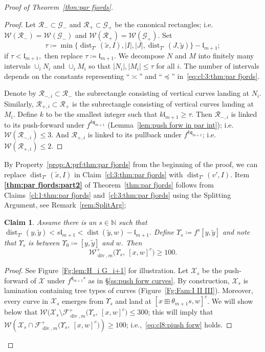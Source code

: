 \documentclass{amsart}
\newcommand{\1}{{\mathbb 1 }}
\newcommand{\FamG}{{\mathcal G}}
\renewcommand{\div}{{\operatorname{div}}}
\newcommand{\Fam}{{\mathcal F}}
\newcommand{\Width}{{\mathcal W}}
\newcommand\RR{\mathcal{R}}
\newcommand\XX{\mathcal{X}}
\newcommand{\qq}{\mathfrak{q}}
\newcommand{\length}{{\mathfrak l}}
\newtheorem{claim8}{Claim}
\newcommand{\N}{\mathbb{N}}
\theoremstyle{remark}
\numberwithin{equation}{section}
\theoremstyle{definition}
\newcommand{\dist}{\operatorname{dist}}
\begin{document}
\begin{proof}[Proof of Theorem~\ref{thm:par fjords}]
\begin{proof}
Let $\RR_-\subset \FamG_-$ and $\RR_+\subset \FamG_+$ be the canonical rectangles; i.e. $\Width(\RR_-)=\Width(\FamG_-)$ and $\Width(\RR_+)=\Width(\FamG_+)$. Set 
\[ \tau\coloneqq \min\{\dist_{T'}(\tilde x, I), |I|,  |J|, \dist_{T'}( J, \tilde y)\}-\length_{m+1};\]
if $\tau< \length_{m+1},$ then replace $\tau\coloneqq \length_{m+1}$. We decompose $N$ and $M$ into finitely many intervals $\cup_i N_i$ and $\cup_i M_i$ so that $|N_i|, |M_i| \le \tau$ for all $i$. The number of intervals depends on the constants representing ``$\asymp$'' and ``$\preceq$'' in~\eqref{eq:cl:3:thm:par fjords}. 

Denote by $\RR_{-,i}\subset \RR_-$ the subrectangle consisting of vertical curves landing at $N_i$. Similarly, $\RR_{+,i}\subset \RR_+$ is the subrectangle consisting of vertical curves landing at $M_i$. Define $k$ to be the smallest integer such that $k\length_{m+1}\ge \tau$.
Then $\RR_{-,i}$ is linked to its push-forward under $f^{k\qq_{m+1}}$ (Lemma~\ref{lem:push forw in par int}); i.e.~$\Width(\RR_{-,i})\le 3$. And $\RR_{+,i}$ is linked to its pullback under $f^{k\qq_{m+1}}$; i.e.~$\Width(\RR_{+,i})\le 2$.
\end{proof}

By Property~\ref{prop:A:prf:thm:par fjords} from the beginning of the proof, we can replace $\dist_{T'}(\tilde x,I)$ in  Claim~\ref{cl:3:thm:par fjords} with $\dist_{T'}(v',I)$. Item {\bf \ref{thm:par fjords:part2}}  of Theorem~\ref{thm:par fjords} follows from Claims~\ref{cl:1:thm:par fjords} and~\ref{cl:3:thm:par fjords} using the Splitting Argument, see Remark~\ref{rem:SplitArg};  


\begin{claim8} 
\label{cl8:piush forw}
Assume there is an $s\in \N$ such that $\dist_{T'}(y,\tilde y) < s\length_{m+1 }< \dist(\tilde y,w)-\length_{m+1}.$ Define 
$\Upsilon_s\coloneqq f^s[ y,\tilde y] $ and note that $\Upsilon_s$ is between $\Upsilon_0\coloneqq [y,\tilde y]$ and $w$. Then 
\begin{equation}
\label{eq:cl8:piush forw}
\Width^+_{\div,m}\big(\Upsilon_s,\  [x,w]^c\big)\ge 100.
\end{equation}
\end{claim8}
\begin{proof}
See Figure~\ref{Fg:lem:H_i G_i+1} for illustration. Let $\XX_s$ be the push-forward of $\XX$ under $f^{\qq_{m+1} s}$ as in \S\ref{ss:push forw curves}. By construction, $\XX_s$ is lamination containing tree types of curves (Figure~\ref{Fg:Fam:I II III}). Moreover, every curve in $\XX_s$ emerges from $\Upsilon _s$ and land at $[x\boxplus \theta_{m+1}s,w]^c$. We will show below that $\Width(\XX_s\setminus \Fam^+_{\div,m}\big(\Upsilon_s,\  [x,w]^c\big)\le 300$; this will imply that $\Width(\XX_s\cap \Fam^+_{\div,m}\big(\Upsilon_s,\  [x,w]^c\big)) \ge 100$; i.e.,~\eqref{eq:cl8:piush forw} holds.


\end{proof}
\end{proof}
\end{document}
